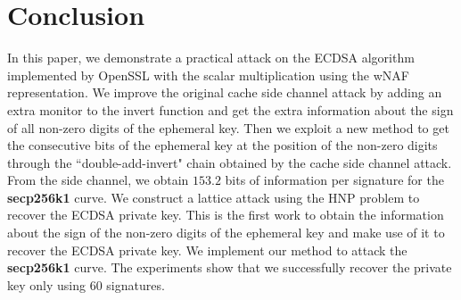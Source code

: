 \section{Conclusion}
\label{sec:conclusion}
In this paper, we demonstrate a practical attack on the ECDSA algorithm implemented by OpenSSL with the scalar multiplication using the wNAF representation.
We improve the original cache side channel attack by adding an extra monitor to the invert function and get the extra information about the sign of all non-zero digits of the ephemeral key.
Then we exploit a new method to get the consecutive bits of the ephemeral key at the position of the non-zero digits through the ``double-add-invert" chain obtained by the cache side channel attack.
From the side channel, we obtain $153.2$ bits of information per signature for the \textbf{secp256k1} curve.
We construct a lattice attack using the HNP problem to recover the ECDSA private key.
This is the first work to obtain the information about the sign of the non-zero digits of the ephemeral key and make use of it to recover the ECDSA private key.
We implement our method to attack the \textbf{secp256k1} curve.
The experiments show that we successfully recover the private key only using $60$ signatures.


